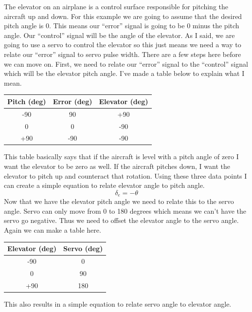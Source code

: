 The elevator on an airplane is a control surface responsible for
pitching the aircraft up and down. For this example we are going to
assume that the desired pitch angle is 0. This means our “error”
signal is going to be 0 minus the pitch angle. Our “control” signal
will be the angle of the elevator. As I said, we are going to use a
servo to control the elevator so this just means we need a way to
relate our “error” signal to servo pulse width. There are a few steps
here before we can move on. First, we need to relate our “error”
signal to the “control” signal which will be the elevator pitch
angle. I’ve made a table below to explain what I mean. 
\begin{table}[H]
\begin{center}
\begin{tabular}{|c|c|c|}
\hline
Pitch (deg) & Error (deg) & Elevator (deg) \\
\hline
-90 & 90 & +90 \\
\hline
0 & 0 & -90 \\
\hline
+90 & -90 & -90 \\
\hline
\end{tabular}
\end{center}
\end{table}
This table basically says that if the aircraft is level with a pitch angle of zero I want the elevator to be zero as well. If the aircraft pitches down, I want the elevator to pitch up and counteract that rotation. Using these three data points I can create a simple equation to relate elevator angle to pitch angle.
\begin{equation}
\delta_e = -\theta
\end{equation}
Now that we have the elevator pitch angle we need to relate this to the servo angle. Servo can only move from 0 to 180 degrees which means we can’t have the servo go negative. Thus we need to offset the elevator angle to the servo angle. Again we can make a table here.
\begin{table}[H]
\begin{center}
\begin{tabular}{|c|c|}
\hline
Elevator (deg) & Servo (deg)\\
\hline
-90 & 0 \\
\hline
0 & 90 \\
\hline
+90 & 180 \\
\hline
\end{tabular}
\end{center}
\end{table}
This also results in a simple equation to relate servo angle to elevator angle.
